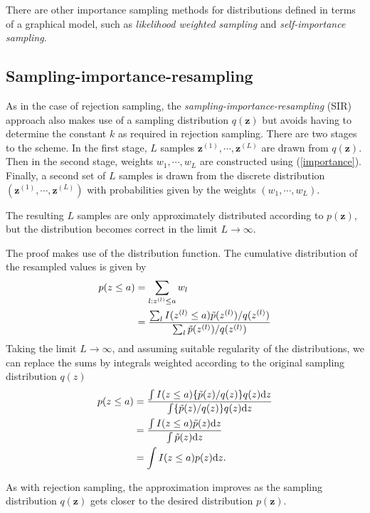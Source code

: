 \documentclass[a4paper]{book}
\newcommand{\ud}{\mathrm{d}}
\renewcommand{\bf}{\mathbf}
\newcommand{\imp}[1]{\textit{#1}}
\begin{document}
There are other importance sampling methods for distributions defined in terms of a graphical model, such as \imp{likelihood weighted sampling} and \imp{self-importance sampling}.
\subsection{Sampling-importance-resampling}
As in the case of rejection sampling, the \imp{sampling-importance-resampling} (SIR) approach also makes use of a sampling distribution $q(\bf{z})$ but avoids having to determine the constant $k$ as required in rejection sampling. There are two stages to the scheme. In the first stage, $L$ samples $\bf{z}^{(1)},\cdots,\bf{z}^{(L)}$ are drawn from $q(\bf{z})$. Then in the second stage, weights $w_1,\cdots,w_L$ are constructed using (\ref{importance}). Finally, a second set of $L$ samples is drawn from the discrete distribution $(\bf{z}^{(1)},\cdots,\bf{z}^{(L)})$ with probabilities given by the weights $(w_1,\cdots,w_L)$.

The resulting $L$ samples are only approximately distributed according to $p(\bf{z})$, but the distribution becomes correct in the limit $L \rightarrow \infty$.

The proof makes use of the distribution function. The cumulative distribution of the resampled values is given by
\begin{align}
	p(z \leq a) &= \sum_{l:z^{(l)}\leq a} w_l \notag \\
	&= \frac{\sum_l I(z^{(l)}\leq a)\tilde{p}(z^{(l)})/q(z^{(l)})}{\sum_l \tilde{p}(z^{(l)})/q(z^{(l)})}
\end{align}
Taking the limit $L \rightarrow \infty$, and assuming suitable regularity of the distributions, we can replace the sums by integrals weighted according to the original sampling distribution $q(z)$
\begin{align}
	p(z \leq a) &= \frac{\int I(z \leq a)\{ \tilde{p}(z)/q(z) \}q(z) \ud z}{\int \{ \tilde{p}(z)/q(z) \} q(z)\ud z} \notag \\
	&= \frac{\int I(z \leq a)\tilde{p}(z)\ud z}{\int \tilde{p}(z)\ud z} \notag \\
	&= \int I(z \leq a)p(z) \ud z.
\end{align}

As with rejection sampling, the approximation improves as the sampling distribution $q(\bf{z})$ gets closer to the desired distribution $p(\bf{z})$.
\end{document}
